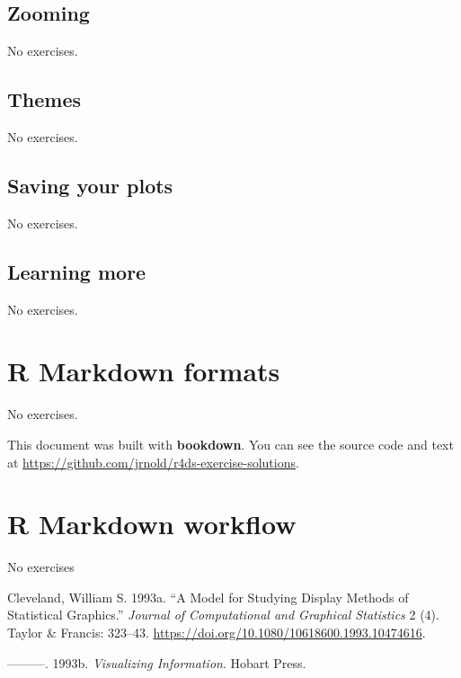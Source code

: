 \documentclass[]{book}
\theoremstyle{plain}
\theoremstyle{remark}
\theoremstyle{definition}
\theoremstyle{definition}
\theoremstyle{definition}
\theoremstyle{remark}
\begin{document}
\hypertarget{zooming}{%
\section{Zooming}\label{zooming}}

No exercises.

\hypertarget{themes}{%
\section{Themes}\label{themes}}

No exercises.

\hypertarget{saving-your-plots}{%
\section{Saving your plots}\label{saving-your-plots}}

No exercises.

\hypertarget{learning-more-2}{%
\section{Learning more}\label{learning-more-2}}

No exercises.

\hypertarget{r-markdown-formats}{%
\chapter{R Markdown formats}\label{r-markdown-formats}}

No exercises.

This document was built with \textbf{bookdown}. You can see the source
code and text at
\url{https://github.com/jrnold/r4ds-exercise-solutions}.

\hypertarget{r-markdown-workflow}{%
\chapter{R Markdown workflow}\label{r-markdown-workflow}}

No exercises

\hypertarget{refs}{}
\leavevmode\hypertarget{ref-Cleveland1993a}{}%
Cleveland, William S. 1993a. ``A Model for Studying Display Methods of
Statistical Graphics.'' \emph{Journal of Computational and Graphical
Statistics} 2 (4). Taylor \& Francis: 323--43.
\url{https://doi.org/10.1080/10618600.1993.10474616}.

\leavevmode\hypertarget{ref-Cleveland1993}{}%
---------. 1993b. \emph{Visualizing Information}. Hobart Press.
\end{document}

